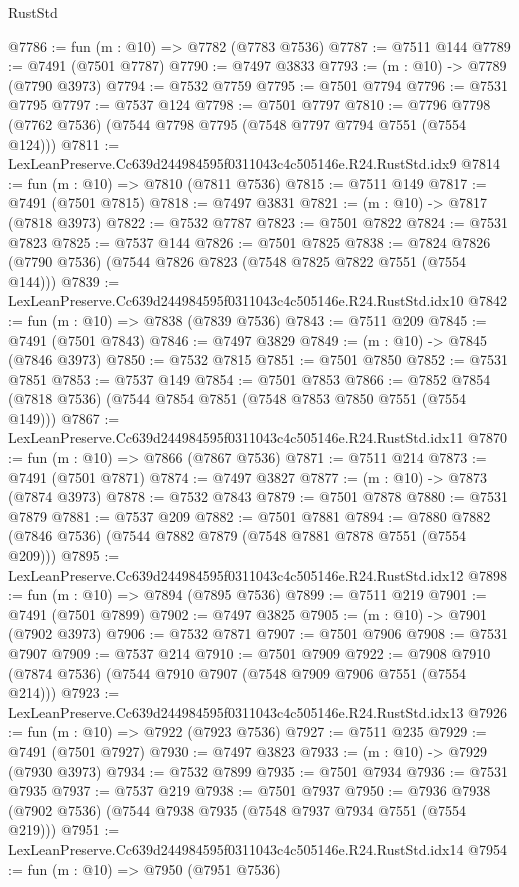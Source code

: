 \begin{lexlean}{RustStd}
\begin{coremodule}
@7786 := fun (m : @10) => @7782 (@7783 @7536)
@7787 := @7511 @144
@7789 := @7491 (@7501 @7787)
@7790 := @7497 @3833
@7793 := (m : @10) -> @7789 (@7790 @3973)
@7794 := @7532 @7759
@7795 := @7501 @7794
@7796 := @7531 @7795
@7797 := @7537 @124
@7798 := @7501 @7797
@7810 := @7796 @7798 (@7762 @7536) (@7544 @7798 @7795 (@7548 @7797 @7794 @7551 (@7554 @124)))
@7811 := LexLeanPreserve.Cc639d244984595f0311043c4c505146e.R24.RustStd.idx9
@7814 := fun (m : @10) => @7810 (@7811 @7536)
@7815 := @7511 @149
@7817 := @7491 (@7501 @7815)
@7818 := @7497 @3831
@7821 := (m : @10) -> @7817 (@7818 @3973)
@7822 := @7532 @7787
@7823 := @7501 @7822
@7824 := @7531 @7823
@7825 := @7537 @144
@7826 := @7501 @7825
@7838 := @7824 @7826 (@7790 @7536) (@7544 @7826 @7823 (@7548 @7825 @7822 @7551 (@7554 @144)))
@7839 := LexLeanPreserve.Cc639d244984595f0311043c4c505146e.R24.RustStd.idx10
@7842 := fun (m : @10) => @7838 (@7839 @7536)
@7843 := @7511 @209
@7845 := @7491 (@7501 @7843)
@7846 := @7497 @3829
@7849 := (m : @10) -> @7845 (@7846 @3973)
@7850 := @7532 @7815
@7851 := @7501 @7850
@7852 := @7531 @7851
@7853 := @7537 @149
@7854 := @7501 @7853
@7866 := @7852 @7854 (@7818 @7536) (@7544 @7854 @7851 (@7548 @7853 @7850 @7551 (@7554 @149)))
@7867 := LexLeanPreserve.Cc639d244984595f0311043c4c505146e.R24.RustStd.idx11
@7870 := fun (m : @10) => @7866 (@7867 @7536)
@7871 := @7511 @214
@7873 := @7491 (@7501 @7871)
@7874 := @7497 @3827
@7877 := (m : @10) -> @7873 (@7874 @3973)
@7878 := @7532 @7843
@7879 := @7501 @7878
@7880 := @7531 @7879
@7881 := @7537 @209
@7882 := @7501 @7881
@7894 := @7880 @7882 (@7846 @7536) (@7544 @7882 @7879 (@7548 @7881 @7878 @7551 (@7554 @209)))
@7895 := LexLeanPreserve.Cc639d244984595f0311043c4c505146e.R24.RustStd.idx12
@7898 := fun (m : @10) => @7894 (@7895 @7536)
@7899 := @7511 @219
@7901 := @7491 (@7501 @7899)
@7902 := @7497 @3825
@7905 := (m : @10) -> @7901 (@7902 @3973)
@7906 := @7532 @7871
@7907 := @7501 @7906
@7908 := @7531 @7907
@7909 := @7537 @214
@7910 := @7501 @7909
@7922 := @7908 @7910 (@7874 @7536) (@7544 @7910 @7907 (@7548 @7909 @7906 @7551 (@7554 @214)))
@7923 := LexLeanPreserve.Cc639d244984595f0311043c4c505146e.R24.RustStd.idx13
@7926 := fun (m : @10) => @7922 (@7923 @7536)
@7927 := @7511 @235
@7929 := @7491 (@7501 @7927)
@7930 := @7497 @3823
@7933 := (m : @10) -> @7929 (@7930 @3973)
@7934 := @7532 @7899
@7935 := @7501 @7934
@7936 := @7531 @7935
@7937 := @7537 @219
@7938 := @7501 @7937
@7950 := @7936 @7938 (@7902 @7536) (@7544 @7938 @7935 (@7548 @7937 @7934 @7551 (@7554 @219)))
@7951 := LexLeanPreserve.Cc639d244984595f0311043c4c505146e.R24.RustStd.idx14
@7954 := fun (m : @10) => @7950 (@7951 @7536)

\end{coremodule}
\end{lexlean}
